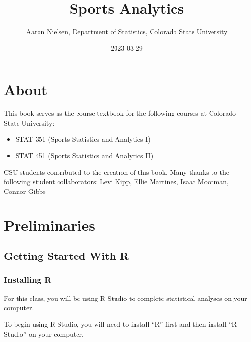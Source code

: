 \documentclass[
  11pt,
]{book}
\title{Sports Analytics}
\author{Aaron Nielsen, Department of Statistics, Colorado State University}
\date{2023-03-29}
\theoremstyle{definition}
\theoremstyle{definition}
\theoremstyle{definition}
\theoremstyle{definition}
\theoremstyle{remark}
\begin{document}
\maketitle

{
\setcounter{tocdepth}{1}
\tableofcontents
}
\hypertarget{about}{%
\chapter*{About}\label{about}}

This book serves as the course textbook for the following courses at Colorado State University:

\begin{itemize}
\item
  STAT 351 (Sports Statistics and Analytics I)
\item
  STAT 451 (Sports Statistics and Analytics II)
\end{itemize}

\hfill\break

CSU students contributed to the creation of this book. Many thanks to the following student collaborators: Levi Kipp, Ellie Martinez, Isaac Moorman, Connor Gibbs

\hypertarget{preliminaries}{%
\chapter*{Preliminaries}\label{preliminaries}}

\hypertarget{getting-started-with-r}{%
\section*{Getting Started With R}\label{getting-started-with-r}}

\hypertarget{installing-r}{%
\subsection*{Installing R}\label{installing-r}}

For this class, you will be using R Studio to complete statistical analyses on your computer.

To begin using R Studio, you will need to install ``R'' first and then install ``R Studio'' on your computer.
\end{document}
